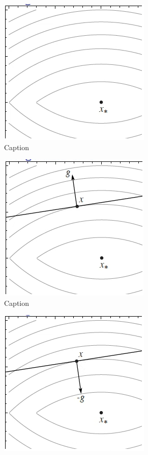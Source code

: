 \begin{figure}
    \centering
    \begin{subfigure}{0.31\textwidth}
        \centering
        \includegraphics[scale=0.35]{figures/2/sub-example/sub_example1.png}
        \caption{Caption}
        \label{fig:sub_example1}
    \end{subfigure}
    \begin{subfigure}{0.31\textwidth}
        \centering
        \includegraphics[scale=0.35]{figures/2/sub-example/sub_example2.png}
        \caption{Caption}
        \label{fig:sub_example2}
    \end{subfigure}
    \begin{subfigure}{0.31\textwidth}
        \centering
        \includegraphics[scale=0.35]{figures/2/sub-example/sub_example3.png}

\end{subfigure}
\end{figure}
